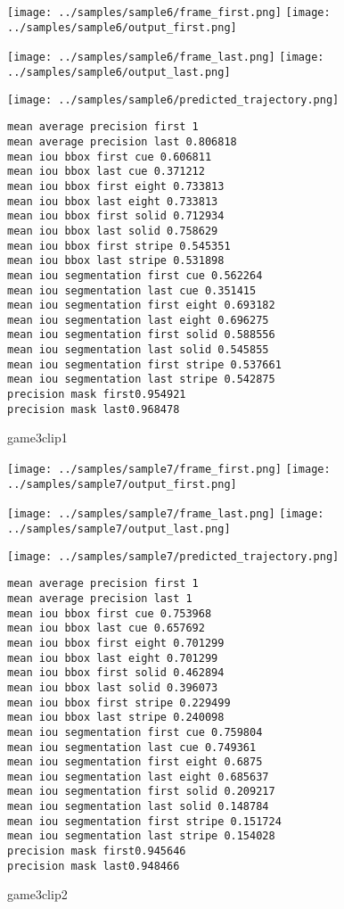 \begin{figure}
\texttt{[image: ../samples/sample6/frame\_first.png]}
\texttt{[image: ../samples/sample6/output\_first.png]}\par
\texttt{[image: ../samples/sample6/frame\_last.png]}
\texttt{[image: ../samples/sample6/output\_last.png]}\par
\texttt{[image: ../samples/sample6/predicted\_trajectory.png]}
\caption{game3clip1}
\begin{verbatim}
mean average precision first 1
mean average precision last 0.806818
mean iou bbox first cue 0.606811
mean iou bbox last cue 0.371212
mean iou bbox first eight 0.733813
mean iou bbox last eight 0.733813
mean iou bbox first solid 0.712934
mean iou bbox last solid 0.758629
mean iou bbox first stripe 0.545351
mean iou bbox last stripe 0.531898
mean iou segmentation first cue 0.562264
mean iou segmentation last cue 0.351415
mean iou segmentation first eight 0.693182
mean iou segmentation last eight 0.696275
mean iou segmentation first solid 0.588556
mean iou segmentation last solid 0.545855
mean iou segmentation first stripe 0.537661
mean iou segmentation last stripe 0.542875
precision mask first0.954921
precision mask last0.968478
\end{verbatim}
\end{figure}

\begin{figure}
\texttt{[image: ../samples/sample7/frame\_first.png]}
\texttt{[image: ../samples/sample7/output\_first.png]}\par
\texttt{[image: ../samples/sample7/frame\_last.png]}
\texttt{[image: ../samples/sample7/output\_last.png]}\par
\texttt{[image: ../samples/sample7/predicted\_trajectory.png]}
\caption{game3clip2}
\begin{verbatim}
mean average precision first 1
mean average precision last 1
mean iou bbox first cue 0.753968
mean iou bbox last cue 0.657692
mean iou bbox first eight 0.701299
mean iou bbox last eight 0.701299
mean iou bbox first solid 0.462894
mean iou bbox last solid 0.396073
mean iou bbox first stripe 0.229499
mean iou bbox last stripe 0.240098
mean iou segmentation first cue 0.759804
mean iou segmentation last cue 0.749361
mean iou segmentation first eight 0.6875
mean iou segmentation last eight 0.685637
mean iou segmentation first solid 0.209217
mean iou segmentation last solid 0.148784
mean iou segmentation first stripe 0.151724
mean iou segmentation last stripe 0.154028
precision mask first0.945646
precision mask last0.948466
\end{verbatim}
\end{figure}

